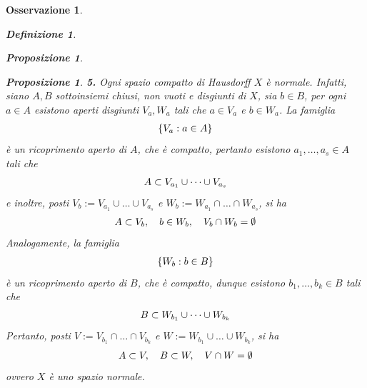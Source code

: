 \documentclass[oneside, 11pt]{amsbook}
\newcommand{\0}{{(0)}}
\newcommand{\3}{{(3)}}
\theoremstyle{colonplain}
\newtheorem{prop}[thm]{Proposizione}
\theoremstyle{colondefinition}
\newtheorem{defn}[thm]{Definizione}
\theoremstyle{colonremark}
\newtheorem{rmk}[thm]{Osservazione}
\numberwithin{equation}{chapter}
\begin{document}
\begin{rmk}
\begin{defn}
\begin{prop}
\begin{prop}
\textbf{5.} Ogni spazio compatto di Hausdorff $X$ è normale. Infatti, siano $A, B$ sottoinsiemi chiusi, non vuoti e disgiunti di $X$, sia $b \in B$, per ogni $a \in A$ esistono aperti disgiunti $V_a, W_a$ tali che $a \in V_a$ e $b \in W_a$. La famiglia
\begin{align}
    \{ V_a : a \in A \} \notag
\end{align}
è un ricoprimento aperto di $A$, che è compatto, pertanto esistono $a_1, \dots, a_s \in A$ tali che
\begin{align}
    A \subset V_{a_1} \cup \dots \cup V_{a_s} \notag
\end{align}
e inoltre, posti $V_b := V_{a_1} \cup \dots \cup V_{a_s}$ e $W_b := W_{a_1} \cap \dots \cap W_{a_s}$, si ha
\begin{align}
    A \subset V_b, \quad b \in W_b, \quad V_b \cap W_b = \emptyset \notag
\end{align}
Analogamente, la famiglia
\begin{align}
    \{ W_b : b \in B \} \notag
\end{align}
è un ricoprimento aperto di $B$, che è compatto, dunque esistono $b_1, \dots, b_k \in B$ tali che
\begin{align}
    B \subset W_{b_1} \cup \dots \cup W_{b_k} \notag
\end{align}
Pertanto, posti $V := V_{b_1} \cap \dots \cap V_{b_k}$ e $W := W_{b_1} \cup \dots \cup W_{b_k}$, si ha
\begin{align}
    A \subset V, \quad B \subset W, \quad V \cap W = \emptyset \notag
\end{align}
ovvero $X$ è uno spazio normale.


\end{prop}
\end{prop}
\end{defn}
\end{rmk}
\end{document}
